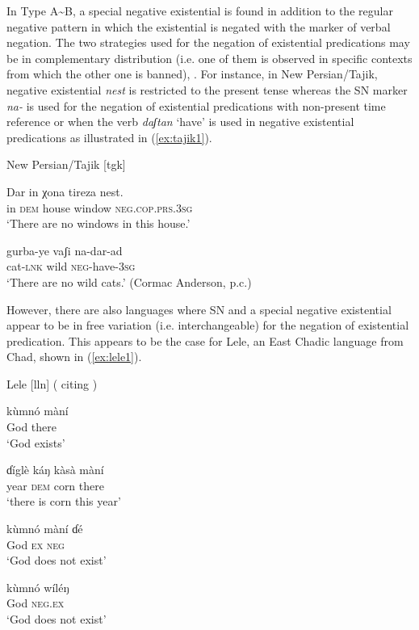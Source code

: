 \documentclass[output=paper,chinesefont,colorlinks,citecolor=brown]{langscibook}
\begin{document}
In Type A{\textasciitilde}B, a special negative existential is found in addition to the regular negative pattern in which the existential is negated with the marker of verbal negation. The two strategies used for the negation of existential predications may be in complementary distribution (i.e.  one of them is observed in specific contexts from which the other one is banned), \citep[7--8]{Croft1991}. For instance, in New Persian{\slash}Tajik, negative existential \textit{nest} is restricted to the present tense whereas the SN marker \textit{na-} is used for the negation of existential predications with non-present time reference or when the verb \textit{daʃtan} `have' is used in negative existential predications as illustrated in (\ref{ex:tajik1}). 

\begin{exe}
\ex New Persian{\slash}Tajik [tgk]  \label{ex:tajik1}
\begin{xlist}
\ex \label{ex:tajik1a}
\gll Dar in χona tireza nest. \\
in \textsc{dem} house window \textsc{neg.cop.prs.3sg} \\
\glt `There are no windows in this house.' \citep[202]{Perry2005}

\ex \label{ex:tajik1b}
\gll gurba-ye vaʃi na-dar-ad \\
cat-\textsc{lnk} wild \textsc{neg}-have-\textsc{3sg} \\
\glt `There are no wild cats.' (Cormac Anderson, p.c.)
\end{xlist}
\end{exe}
However, there are also languages where SN and a special negative existential appear to be in free variation (i.e. interchangeable) for the negation of existential predication. This appears to be the case for Lele, an East Chadic language from Chad, shown in (\ref{ex:lele1}).

\begin{exe}
\ex  Lele [lln] ( citing \citealt[196]{Frajzyngier2001}) \label{ex:lele1}

\begin{xlist}
\ex  \label{ex:lele1a}
\gll kùmnó màní\\
God there\\
\glt `God exists'

\ex  \label{ex:lele1b}
\gll ɗíglè káŋ kàsà màní\\ 
year \textsc{dem} corn there\\
\glt `there is corn this year'

\ex  \label{ex:lele1c}
\gll kùmnó màní ɗé\\
God \textsc{ex} \textsc{neg}\\ 
\glt `God does not exist'

\ex  \label{ex:lele1d}
\gll kùmnó wíléŋ\\
God \textsc{neg.ex}\\ 
\glt `God does not exist'

\end{xlist}
\end{exe} 
\end{document}
